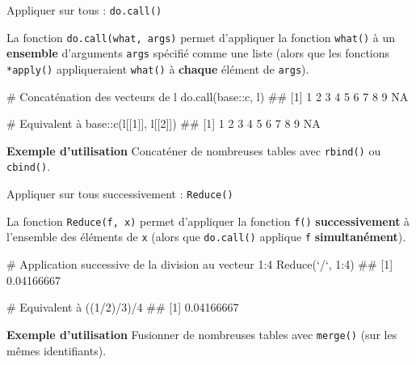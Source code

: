 \documentclass[12pt,ignorenonframetext,handout,]{beamer}
\newenvironment{Shaded}{}{}
\newcommand{\CommentTok}[1]{\textcolor[rgb]{0.00,0.50,0.00}{#1}}
\newcommand{\DataTypeTok}[1]{#1}
\newcommand{\DecValTok}[1]{#1}
\newcommand{\KeywordTok}[1]{\textcolor[rgb]{0.00,0.00,1.00}{#1}}
\newcommand{\NormalTok}[1]{#1}
\newcommand{\OperatorTok}[1]{#1}
\newcommand{\StringTok}[1]{\textcolor[rgb]{0.00,0.50,0.50}{#1}}
\renewenvironment{Shaded}{\begin{snugshade}}{\end{snugshade}}
\newcommand{\intertitre}[1]{\textcolor{redInsee}{\textbf{#1}}}
\begin{document}
\begin{frame}[fragile]{\large Appliquer sur tous : \texttt{do.call()}}
\protect\hypertarget{appliquer-sur-tous-do.call}{}

La fonction \texttt{do.call(what,\ args)} permet d’appliquer la fonction
\texttt{what()} à un \textbf{ensemble} d’arguments \texttt{args}
spécifié comme une liste (alors que les fonctions \texttt{*apply()}
appliqueraient \texttt{what()} à \textbf{chaque} élément de
\texttt{args}).

\pause \small

\begin{Shaded}
\begin{Highlighting}[]
\CommentTok{# Concaténation des vecteurs de l}
\KeywordTok{do.call}\NormalTok{(base}\OperatorTok{::}\NormalTok{c, l)}
\NormalTok{  ##  [1]  1  2  3  4  5  6  7  8  9 NA}

\CommentTok{# Equivalent à }
\NormalTok{base}\OperatorTok{::}\KeywordTok{c}\NormalTok{(l[[}\DecValTok{1}\NormalTok{]], l[[}\DecValTok{2}\NormalTok{]])}
\NormalTok{  ##  [1]  1  2  3  4  5  6  7  8  9 NA}
\end{Highlighting}
\end{Shaded}

\pause \normalsize

\intertitre{Exemple d'utilisation} Concaténer de nombreuses tables avec
\texttt{rbind()} ou \texttt{cbind()}.

\end{frame}

\begin{frame}[fragile]{\large Appliquer sur tous successivement :
\texttt{Reduce()}}
\protect\hypertarget{appliquer-sur-tous-successivement-reduce}{}

La fonction \texttt{Reduce(f,\ x)} permet d’appliquer la fonction
\texttt{f()} \textbf{successivement} à l’ensemble des éléments de
\texttt{x} (alors que \texttt{do.call()} applique \texttt{f}
\textbf{simultanément}).

\pause \small

\begin{Shaded}
\begin{Highlighting}[]
\CommentTok{# Application successive de la division au vecteur 1:4}
\KeywordTok{Reduce}\NormalTok{(}\StringTok{`}\DataTypeTok{/}\StringTok{`}\NormalTok{, }\DecValTok{1}\OperatorTok{:}\DecValTok{4}\NormalTok{)}
\NormalTok{  ## [1] 0.04166667}

\CommentTok{# Equivalent à }
\NormalTok{((}\DecValTok{1}\OperatorTok{/}\DecValTok{2}\NormalTok{)}\OperatorTok{/}\DecValTok{3}\NormalTok{)}\OperatorTok{/}\DecValTok{4}
\NormalTok{  ## [1] 0.04166667}
\end{Highlighting}
\end{Shaded}

\pause \normalsize

\intertitre{Exemple d'utilisation} Fusionner de nombreuses tables avec
\texttt{merge()} (sur les mêmes identifiants).

\end{frame}
\end{document}
